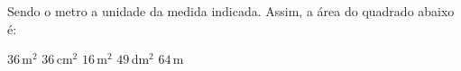 Sendo o metro a unidade da medida indicada. Assim, a \'area do quadrado abaixo \'e:

\parbox{0.35\linewidth}{

$36$\,m$^2$
$36$\,cm$^2$
$16$\,m$^2$
$49$\,dm$^2$
$64$\,m

}\parbox{0.64\linewidth}{
\begin{center}
\vspace{-6mm}
\vspace{-9mm}
\end{center}
}


